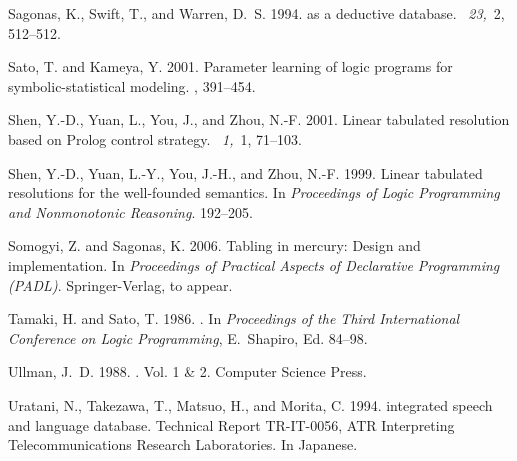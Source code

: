 \documentclass{tlp}
\begin{document}
\begin{thebibliography}{}
{\sc Sagonas, K.}, {\sc Swift, T.}, {\sc and} {\sc Warren, D.~S.} 1994.
 as a deductive database.
~{\em 23,\/}~2, 512--512.

{\sc Sato, T.} {\sc and} {\sc Kameya, Y.} 2001.
\newblock Parameter learning of logic programs for symbolic-statistical
  modeling.
, 391--454.

{\sc Shen, Y.-D.}, {\sc Yuan, L.}, {\sc You, J.}, {\sc and} {\sc Zhou, N.-F.}
  2001.
\newblock Linear tabulated resolution based on {P}rolog control strategy.
~{\em 1,\/}~1,
  71--103.

{\sc Shen, Y.-D.}, {\sc Yuan, L.-Y.}, {\sc You, J.-H.}, {\sc and} {\sc Zhou,
  N.-F.} 1999.
\newblock Linear tabulated resolutions for the well-founded semantics.
\newblock In {\em Proceedings of Logic Programming and Nonmonotonic Reasoning}.
  192--205.

{\sc Somogyi, Z.} {\sc and} {\sc Sagonas, K.} 2006.
\newblock Tabling in mercury: Design and implementation.
\newblock In {\em Proceedings of Practical Aspects of Declarative Programming
  (PADL)}. Springer-Verlag, to appear.

{\sc Tamaki, H.} {\sc and} {\sc Sato, T.} 1986.
.
\newblock In {\em Proceedings of the Third International Conference on Logic
  Programming}, {E.~Shapiro}, Ed. 84--98.

{\sc Ullman, J.~D.} 1988.
. Vol. 1 \& 2.
\newblock Computer Science Press.

{\sc Uratani, N.}, {\sc Takezawa, T.}, {\sc Matsuo, H.}, {\sc and} {\sc Morita,
  C.} 1994.
 integrated speech and language database.
\newblock Technical Report {TR-IT-0056}, {ATR} Interpreting Telecommunications
  Research Laboratories.
\newblock In Japanese.


\end{thebibliography}
\end{document}
